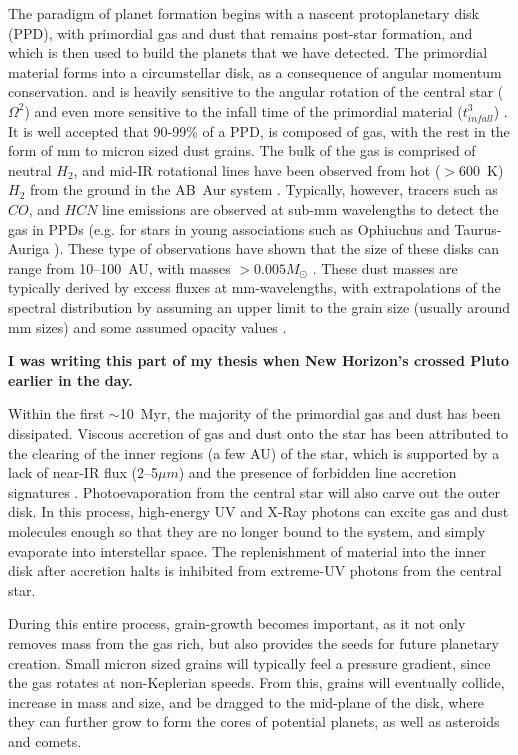     The paradigm of planet formation begins with a nascent protoplanetary disk (PPD), with primordial gas and dust that remains post-star formation, and which is then used to build the planets that we have detected. The primordial material forms into a circumstellar disk, as a consequence of angular momentum conservation. and is heavily sensitive to the angular rotation of the central star ($\Omega^2$) and even more sensitive to the infall time of the primordial material ($t_{infall}^3$) \citep{Terebey1984}. It is well accepted that 90-99\% of a PPD, is composed of gas, with the rest in the form of mm to micron sized dust grains. The bulk of the gas is comprised of neutral $H_2$, and mid-IR rotational lines have been observed from hot ($>600$~K) $H_2$ from the ground in the AB~Aur system \citep{Bitner2007}. Typically, however, tracers such as $CO$, and $HCN$ line emissions are observed at sub-mm wavelengths to detect the gas in PPDs (e.g. for stars in young associations such as Ophiuchus \citep{Andre1994} and Taurus-Auriga \citep{Beckwith1990}). These type of observations have shown that the size of these disks can range from 10--100~AU, with masses $>0.005M_\odot$ \citep{Osterloh1995}. These dust masses are typically derived by excess fluxes at mm-wavelengths, with extrapolations of the spectral distribution by assuming an upper limit to the grain size (usually around mm sizes) and some assumed opacity values \citep{Beckwith1990}. 
    
    \textbf{I was writing this part of my thesis when New Horizon's crossed Pluto earlier in the day.}
    
    Within the first $\sim$10~Myr, the majority of the primordial gas and dust has been dissipated. Viscous accretion of gas and dust onto the star has been attributed to the clearing of the inner regions (a few AU) of the star, which is supported by a lack of near-IR flux (2--5$\mu m$) and the presence of forbidden line accretion signatures \citep[(e.g., O~I, S~II)][]{Hartigan1995}. Photoevaporation from the central star will also carve out the outer disk. In this process, high-energy UV and X-Ray photons can excite gas and dust molecules enough so that they are no longer bound to the system, and simply evaporate into interstellar space. The replenishment of material into the inner disk after accretion halts is inhibited from extreme-UV photons from the central star. 
    
    
    During this entire process, grain-growth becomes important, as it not only removes mass from the gas rich, but also provides the seeds for future planetary creation. Small micron sized grains will typically feel a pressure gradient, since the gas rotates at non-Keplerian speeds. From this, grains will eventually collide, increase in mass and size, and be dragged to the mid-plane of the disk, where they can further grow to form the cores of potential planets, as well as asteroids and comets. 
    
